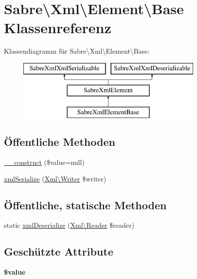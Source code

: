 \hypertarget{class_sabre_1_1_xml_1_1_element_1_1_base}{}\section{Sabre\textbackslash{}Xml\textbackslash{}Element\textbackslash{}Base Klassenreferenz}
\label{class_sabre_1_1_xml_1_1_element_1_1_base}
Klassendiagramm für Sabre\textbackslash{}Xml\textbackslash{}Element\textbackslash{}Base\+:\begin{figure}[H]
\begin{center}
\leavevmode
\includegraphics[height=3.000000cm]{class_sabre_1_1_xml_1_1_element_1_1_base}
\end{center}
\end{figure}
\subsection*{Öffentliche Methoden}
\begin{DoxyCompactItemize}
\item 
\mbox{\hyperlink{class_sabre_1_1_xml_1_1_element_1_1_base_a6d9aa0c2164fdbef10f6e631fe61dffb}{\+\_\+\+\_\+construct}} (\$value=null)
\item 
\mbox{\hyperlink{class_sabre_1_1_xml_1_1_element_1_1_base_a2666be672b289416482fbb23e1045dad}{xml\+Serialize}} (\mbox{\hyperlink{class_sabre_1_1_xml_1_1_writer}{Xml\textbackslash{}\+Writer}} \$writer)
\end{DoxyCompactItemize}
\subsection*{Öffentliche, statische Methoden}
\begin{DoxyCompactItemize}
\item 
static \mbox{\hyperlink{class_sabre_1_1_xml_1_1_element_1_1_base_a7358dc9b94ce28633227d15cf95b3e80}{xml\+Deserialize}} (\mbox{\hyperlink{class_sabre_1_1_xml_1_1_reader}{Xml\textbackslash{}\+Reader}} \$reader)
\end{DoxyCompactItemize}
\subsection*{Geschützte Attribute}
\begin{DoxyCompactItemize}
\item 
\mbox{\label{class_sabre_1_1_xml_1_1_element_1_1_base_ac0e6afbe6eedc062ae39257fd8ec7ec8}} 
{\bfseries \$value}
\end{DoxyCompactItemize}


